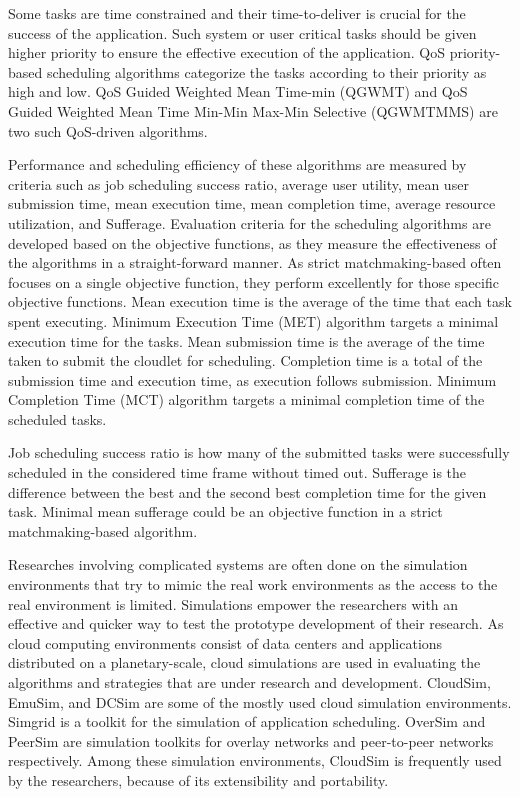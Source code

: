 \documentclass[times, 10pt,twocolumn]{article}
\begin{document}
Some tasks are time constrained and their time-to-deliver is crucial for the success of the application. Such system or user critical tasks should be given higher priority to ensure the effective execution of the application. QoS priority-based scheduling algorithms categorize the tasks according to their priority as high and low. QoS Guided Weighted Mean Time-min (QGWMT) and QoS Guided Weighted Mean Time Min-Min Max-Min Selective (QGWMTMMS) are two such QoS-driven algorithms\cite{qosgrid}. 

Performance and scheduling efficiency of these algorithms are measured by criteria such as job scheduling success ratio, average user utility, mean user submission time, mean execution time, mean completion time, average resource utilization, and Sufferage. Evaluation criteria for the scheduling algorithms are developed based on the objective functions, as they measure the effectiveness of the algorithms in a straight-forward manner. As strict matchmaking-based often focuses on a single objective function, they perform excellently for those specific objective functions. Mean execution time is the average of the time that each task spent executing. Minimum Execution Time (MET) algorithm targets a minimal execution time for the tasks. Mean submission time is the average of the time taken to submit the cloudlet for scheduling. Completion time is a total of the submission time and execution time, as execution follows submission. Minimum Completion Time
 (MCT) algorithm targets a minimal completion time of the scheduled tasks.

Job scheduling success ratio is how many of the submitted tasks were successfully scheduled in the considered time frame without timed out. Sufferage is the difference between the best and the second best completion time for the given task\cite{sufferage}. Minimal mean sufferage could be an objective function in a strict matchmaking-based algorithm.


Researches involving complicated systems are often done on the simulation environments that try to mimic the real work environments as the access to the real environment is limited. Simulations empower the researchers with an effective and quicker way to test the prototype development of their research. As cloud computing environments consist of data centers and applications distributed on a planetary-scale, cloud simulations are used in evaluating the algorithms and strategies that are under research and development. CloudSim, EmuSim\cite{emusim}, and DCSim\cite{dcsim} are some of the mostly used cloud simulation environments. Simgrid\cite{simgrid} is a toolkit for the simulation of application scheduling. OverSim\cite{oversim} and PeerSim\cite{peersim} are simulation toolkits for overlay networks and peer-to-peer networks respectively. Among these simulation environments, CloudSim is frequently used by the researchers, because of its extensibility and portability. 
\end{document}
